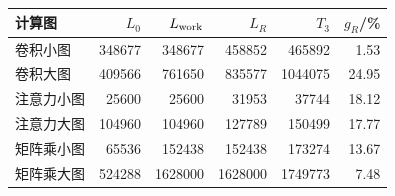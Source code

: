 {\setlength{\tabcolsep}{12pt}\begin{tabular}{lrrrrr}\toprule
计算图 & $L_0$ & $L_{\rm work}$ & $L_R$ & $T_3$ & $g_R$/\%\\\midrule
卷积小图 & 348677 & 348677 & 458852 & 465892 & 1.53\\
卷积大图 & 409566 & 761650 & 835577 & 1044075 & 24.95\\
注意力小图 & 25600 & 25600 & 31953 & 37744 & 18.12\\
注意力大图 & 104960 & 104960 & 127789 & 150499 & 17.77\\
矩阵乘小图 & 65536 & 152438 & 152438 & 173274 & 13.67\\
矩阵乘大图 & 524288 & 1628000 & 1628000 & 1749773 & 7.48\\
\bottomrule\end{tabular}}
